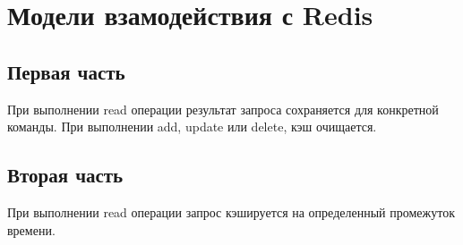 \section{Модели взамодействия с Redis}
\subsection{Первая часть}
При выполнении read операции результат запроса сохраняется для конкретной команды.
При выполнении add, update или delete, кэш очищается.
\subsection{Вторая часть}
При выполнении read операции запрос кэшируется на определенный промежуток времени.


